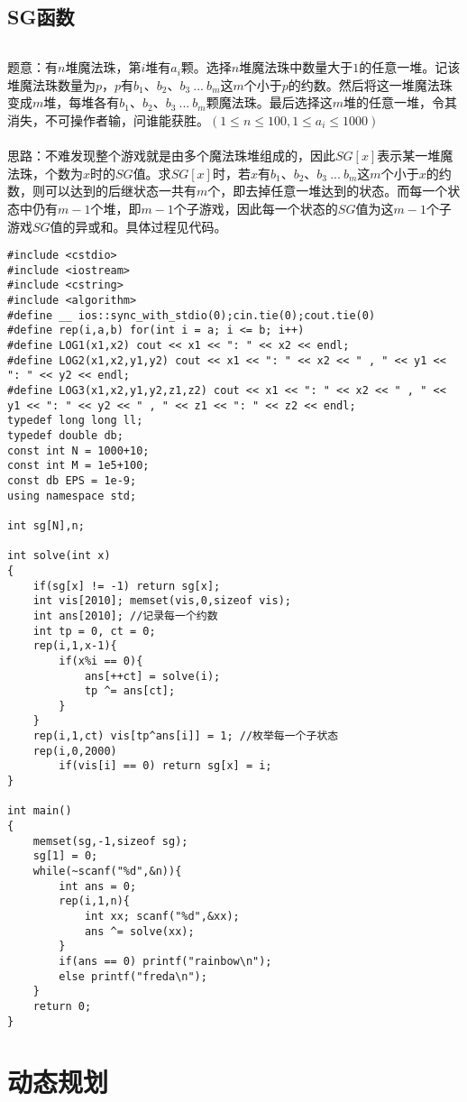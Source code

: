 \documentclass[twoside]{article}
\begin{document}
\subsection{SG函数}
\begin{lstlisting}
\end{lstlisting}
题意：有$n$堆魔法珠，第$i$堆有$a_i$颗。选择$n$堆魔法珠中数量大于$1$的任意一堆。记该堆魔法珠数量为$p$，$p$有$b_1、b_2、b_3\ ...\ b_m$这$m$个小于$p$的约数。然后将这一堆魔法珠变成$m$堆，每堆各有$b_1、b_2、b_3\ ...\ b_m$颗魔法珠。最后选择这$m$堆的任意一堆，令其消失，不可操作者输，问谁能获胜。$(1\leq n\leq 100,1\leq a_i\leq 1000)$\\
\\
思路：不难发现整个游戏就是由多个魔法珠堆组成的，因此$SG[x]$表示某一堆魔法珠，个数为$x$时的$SG$值。求$SG[x]$时，若$x$有$b_1、b_2、b_3\ ...\ b_m$这$m$个小于$x$的约数，则可以达到的后继状态一共有$m$个，即去掉任意一堆达到的状态。而每一个状态中仍有$m-1$个堆，即$m-1$个子游戏，因此每一个状态的$SG$值为这$m-1$个子游戏$SG$值的异或和。具体过程见代码。\\
\begin{lstlisting}
#include <cstdio>
#include <iostream>
#include <cstring>
#include <algorithm>
#define __ ios::sync_with_stdio(0);cin.tie(0);cout.tie(0)
#define rep(i,a,b) for(int i = a; i <= b; i++)
#define LOG1(x1,x2) cout << x1 << ": " << x2 << endl;
#define LOG2(x1,x2,y1,y2) cout << x1 << ": " << x2 << " , " << y1 << ": " << y2 << endl;
#define LOG3(x1,x2,y1,y2,z1,z2) cout << x1 << ": " << x2 << " , " << y1 << ": " << y2 << " , " << z1 << ": " << z2 << endl;
typedef long long ll;
typedef double db;
const int N = 1000+10;
const int M = 1e5+100;
const db EPS = 1e-9;
using namespace std;

int sg[N],n;

int solve(int x)
{
	if(sg[x] != -1) return sg[x];
	int vis[2010]; memset(vis,0,sizeof vis);
	int ans[2010]; //记录每一个约数
	int tp = 0, ct = 0;
	rep(i,1,x-1){
		if(x%i == 0){
			ans[++ct] = solve(i);
			tp ^= ans[ct];
		}
	}
	rep(i,1,ct) vis[tp^ans[i]] = 1; //枚举每一个子状态
	rep(i,0,2000)
		if(vis[i] == 0) return sg[x] = i;
}

int main()
{
	memset(sg,-1,sizeof sg);
	sg[1] = 0;
	while(~scanf("%d",&n)){
		int ans = 0;
		rep(i,1,n){
			int xx; scanf("%d",&xx);
			ans ^= solve(xx);
		}
		if(ans == 0) printf("rainbow\n");
		else printf("freda\n");
	}
	return 0;
}\end{lstlisting}
\clearpage\section{动态规划}
\end{document}
